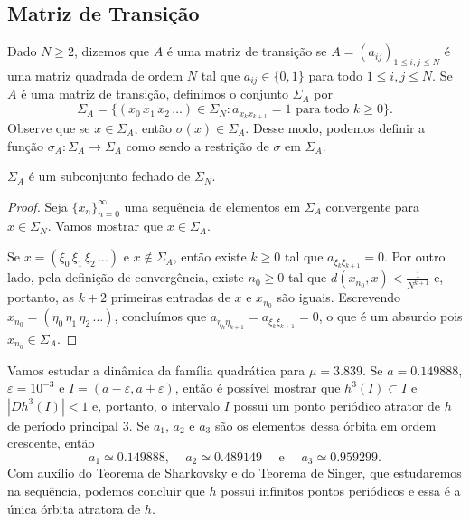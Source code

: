 \subsection{Matriz de Transição}

Dado $N \geq 2$, dizemos que $A$ é uma matriz de transição se $A = (a_{ij})_{1 \leq i,j \leq N}$ é uma matriz quadrada de ordem $N$ tal que $a_{ij} \in \lbrace 0, 1 \rbrace$ para todo $1 \leq i,j \leq N$.
Se $A$ é uma matriz de transição, definimos o conjunto $\Sigma_A$ por
$$\Sigma_A = \lbrace (x_0 \, x_1 \, x_2 \, \dots) \in \Sigma_N : a_{x_k x_{k+1}} = 1 \text{ para todo } k \geq 0 \rbrace.$$
Observe que se $x \in \Sigma_A$, então $\sigma(x) \in \Sigma_A$.
Desse modo, podemos definir a função $\sigma_A: \Sigma_A \to \Sigma_A$ como sendo a restrição de $\sigma$ em $\Sigma_A$.

\begin{proposition}
$\Sigma_A$ é um subconjunto fechado de $\Sigma_N$.
\end{proposition}

\begin{proof}
Seja $\lbrace x_n \rbrace_{n=0}^{\infty}$ uma sequência de elementos em $\Sigma_A$ convergente para $x \in \Sigma_N$.
Vamos mostrar que $x \in \Sigma_A$.

Se $x = (\xi_0 \, \xi_1 \, \xi_2 \, \dots)$ e $x \notin \Sigma_A$, então existe $k \geq 0$ tal que $a_{\xi_k \xi_{k+1}} = 0$. Por outro lado, pela definição de convergência, existe $n_0 \geq 0$ tal que $d(x_{n_0}, x) < \frac{1}{N^{k+1}}$ e, portanto, as $k+2$ primeiras entradas de $x$ e $x_{n_0}$ são iguais. Escrevendo $x_{n_0} = (\eta_0 \, \eta_1 \, \eta_2 \, \dots)$, concluímos que $a_{\eta_k \eta_{k+1}} = a_{\xi_k \xi_{k+1}} = 0$, o que é um absurdo pois $x_{n_0} \in \Sigma_A$.
\end{proof}

Vamos estudar a dinâmica da família quadrática para $\mu = 3.839$.
Se $a = 0.149888$, $\varepsilon = 10^{-3}$ e $I = (a - \varepsilon, a + \varepsilon)$, então é possível mostrar que $h^3(I) \subset I$ e $|D h^3(I)| < 1$ e, portanto, o intervalo $I$ possui um ponto periódico atrator de $h$ de período principal $3$. Se $a_1$, $a_2$ e $a_3$ são os elementos dessa órbita em ordem crescente, então
$$a_1 \simeq 0.149888 \text{, } \quad a_2 \simeq 0.489149 \quad \text{ e } \quad a_3 \simeq 0.959299.$$
Com auxílio do Teorema de Sharkovsky e do Teorema de Singer, que estudaremos na sequência, podemos concluir que $h$ possui infinitos pontos periódicos e essa é a única órbita atratora de $h$.


